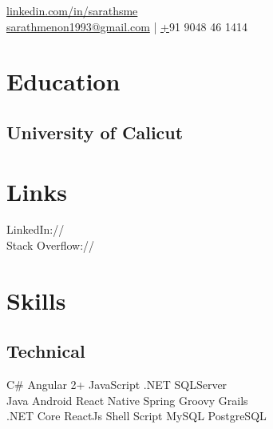 \documentclass[]{deedy-resume-openfont}
\begin{document}
%
%
\lastupdated

%
%


{
    \href{https://www.linkedin.com/in/sarathsme}{linkedin.com/in/sarathsme} \\
    \href{mailto:sarathmenon1993@gmail.com}{sarathmenon1993@gmail.com} | \href{tel:+919048461414} +91 9048 46 1414
}

%
%

\begin{minipage}[t]{0.33\textwidth} 


\section{Education} 

\subsection{University of Calicut}
\sectionsep


\section{Links}
LinkedIn://  \href{https://www.linkedin.com/in/sarathsme}{} \\
Stack Overflow://  \href{https://stackoverflow.com/users/6498687/sarath-s-menon}{}
\sectionsep


\section{Skills}
\subsection{Technical}
C\# \textbullet{} Angular 2+ \textbullet{} JavaScript \textbullet{} .NET \textbullet{} SQLServer \\ 
Java \textbullet{} Android \textbullet{} React Native  \textbullet{} Spring \textbullet{} Groovy \textbullet{} Grails \\
.NET Core \textbullet{} ReactJs \textbullet{} Shell Script \textbullet{} MySQL \textbullet{} PostgreSQL 
\sectionsep


\end{minipage}
\end{document}
